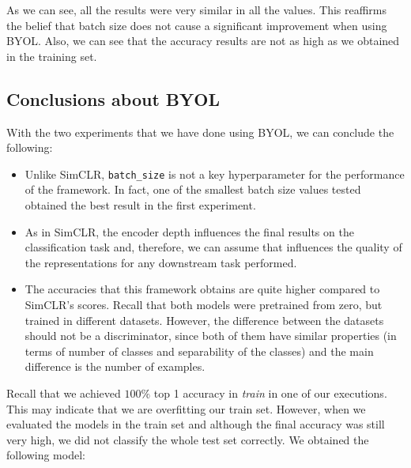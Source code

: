 As we can see, all the results were very similar in all the values. This reaffirms the belief that batch size does not cause a significant improvement when using BYOL. Also, we can see that the accuracy results are not as high as we obtained in the training set.

\subsection{Conclusions about BYOL}

With the two experiments that we have done using BYOL, we can conclude the following:
\begin{itemize}
\item Unlike SimCLR, \lstinline{batch_size} is not a key hyperparameter for the performance of the framework. In fact, one of the smallest batch size values tested obtained the best result in the first experiment.

\item As in SimCLR, the encoder depth influences the final results on the classification task and, therefore, we can assume that influences the quality of the representations for any downstream task performed.


\item The accuracies that this framework obtains are quite higher compared to SimCLR's scores. Recall that both models were pretrained from zero, but trained in different datasets. However, the difference between the datasets should not be a discriminator, since both of them have similar properties (in terms of number of classes and separability of the classes) and the main difference is the number of examples.


\end{itemize}

Recall that we achieved $100\%$ top 1 accuracy in \emph{train} in one of our executions. This may indicate that we are overfitting our train set. However, when we evaluated the models in the train set and although the final accuracy was still very high, we did not classify the whole test set correctly. We obtained the following model:


\begin{table}[H]
    \caption{Conclusion of the experiments with BYOL.}
    \label{table:byol:conclusions}
    \end{table}
